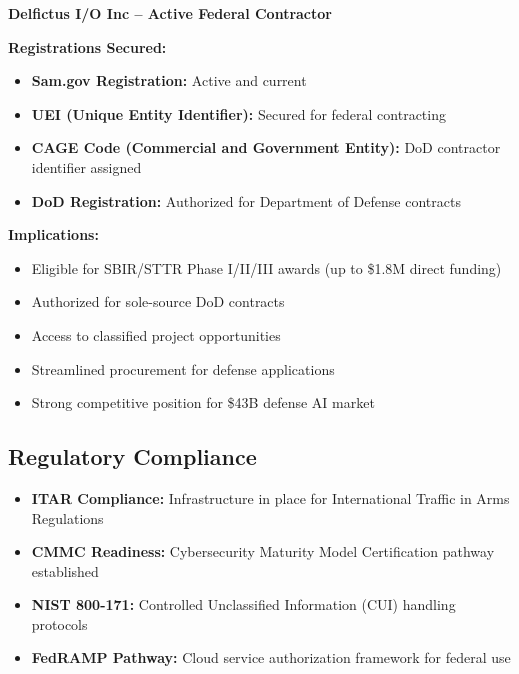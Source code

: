 \documentclass[11pt,letterpaper]{article}
\begin{document}
\begin{tcolorbox}[colback=lightgray,colframe=primaryblue,title=DoD \& Federal Registration]
\textbf{Delfictus I/O Inc -- Active Federal Contractor}

\vspace{0.3cm}
\textbf{Registrations Secured:}
\begin{itemize}[leftmargin=*]
    \item \textbf{Sam.gov Registration:} Active and current
    \item \textbf{UEI (Unique Entity Identifier):} Secured for federal contracting
    \item \textbf{CAGE Code (Commercial and Government Entity):} DoD contractor identifier assigned
    \item \textbf{DoD Registration:} Authorized for Department of Defense contracts
\end{itemize}

\vspace{0.3cm}
\textbf{Implications:}
\begin{itemize}[leftmargin=*]
    \item Eligible for SBIR/STTR Phase I/II/III awards (up to \$1.8M direct funding)
    \item Authorized for sole-source DoD contracts
    \item Access to classified project opportunities
    \item Streamlined procurement for defense applications
    \item Strong competitive position for \$43B defense AI market
\end{itemize}
\end{tcolorbox}

\subsection{Regulatory Compliance}

\begin{itemize}
    \item \textbf{ITAR Compliance:} Infrastructure in place for International Traffic in Arms Regulations
    \item \textbf{CMMC Readiness:} Cybersecurity Maturity Model Certification pathway established
    \item \textbf{NIST 800-171:} Controlled Unclassified Information (CUI) handling protocols
    \item \textbf{FedRAMP Pathway:} Cloud service authorization framework for federal use
\end{itemize}
\end{document}
